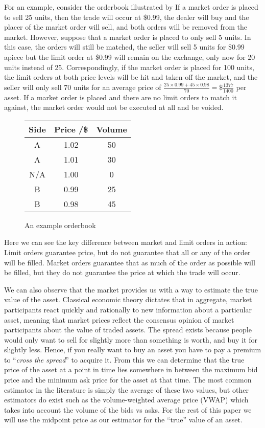 For an example, consider the orderbook illustrated by %
If a market order is placed to sell 25 units, then the trade will occur at \$0.99, the dealer will buy and the placer of the market order will sell, 
and both orders will be removed from the market. However, suppose that a market order is placed to only sell 5 units. 
In this case, the orders will still be matched, the seller will sell 5 units for \$0.99 apiece but the limit order at \$0.99 will remain on the exchange, 
only now for 20 units instead of 25. Correspondingly, if the market order is placed for 100 units, 
the limit orders at both price levels will be hit and taken off the market, 
and the seller will only sell 70 units for an average price of $\frac{25\times0.99+45\times0.98}{70}=\$\frac{1377}{1400}$ per asset. 
If a market order is placed and there are no limit orders to match it against, the market order would not be executed at all and be voided.

\begin{figure}
\centering
    \begin{tabular}{ |c|c|c| } 
        \hline
        Side & Price /\$ & Volume \\ 
        \hline
        A & 1.02 & 50 \\
        A & 1.01 & 30 \\
        N/A & 1.00 & 0 \\
        B & 0.99 & 25 \\ 
        B & 0.98 & 45 \\
        \hline
    \end{tabular}
    \caption{An example orderbook}
    \label{fig:orderbook}
\end{figure}

Here we can see the key difference between market and limit orders in action: Limit orders guarantee price, 
but do not guarantee that all or any of the order will be filled. Market orders guarantee that as much of the order as possible will be filled, 
but they do not guarantee the price at which the trade will occur.

We can also observe that the market provides us with a way to estimate the true value of the asset. 
Classical economic theory dictates that in aggregate, market participants react quickly and rationally to new information about a particular asset, 
meaning that market prices reflect the consensus opinion of market participants about the value of traded assets. 
The spread exists because people would only want to sell for slightly more than something is worth, and buy it for slightly less. 
Hence, if you really want to buy an asset you have to pay a premium to ``\textit{cross the spread}'' to acquire it. 
From this we can determine that the true price of the asset at a point in time lies somewhere in between the maximum bid price and the 
minimum ask price for the asset at that time. The most common estimator in the literature is simply the average of these two values, 
but other estimators do exist such as the volume-weighted average price (VWAP) which takes into account the volume of the bids vs asks. 
For the rest of this paper we will use the midpoint price as our estimator for the ``true'' value of an asset.

